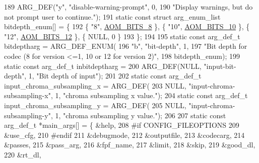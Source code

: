 \begin{DoxyCodeInclude}
{{189     ARG\_DEF(\textcolor{stringliteral}{"y"}, \textcolor{stringliteral}{"disable-warning-prompt"}, 0,
190             \textcolor{stringliteral}{"Display warnings, but do not prompt user to continue."});
191 \textcolor{keyword}{static} \textcolor{keyword}{const} \textcolor{keyword}{struct }arg\_enum\_list bitdepth\_enum[] = \{
192   \{ \textcolor{stringliteral}{"8"}, \hyperlink{group__codec_gga6ed0e98eba4651c1ad845e39498e4153a4c7f55539160206a3fbb2a6cfc9ef89c}{AOM\_BITS\_8} \}, \{ \textcolor{stringliteral}{"10"}, \hyperlink{group__codec_gga6ed0e98eba4651c1ad845e39498e4153a91734384f432233c3d681052122ab8e7}{AOM\_BITS\_10} \}, \{ \textcolor{stringliteral}{"12"}, 
      \hyperlink{group__codec_gga6ed0e98eba4651c1ad845e39498e4153a15836a87f9e9940885d5ef59a52bf728}{AOM\_BITS\_12} \}, \{ NULL, 0 \}
193 \};
194 
195 \textcolor{keyword}{static} \textcolor{keyword}{const} arg\_def\_t bitdeptharg = ARG\_DEF\_ENUM(
196     \textcolor{stringliteral}{"b"}, \textcolor{stringliteral}{"bit-depth"}, 1,
197     \textcolor{stringliteral}{"Bit depth for codec (8 for version <=1, 10 or 12 for version 2)"},
198     bitdepth\_enum);
199 \textcolor{keyword}{static} \textcolor{keyword}{const} arg\_def\_t inbitdeptharg =
200     ARG\_DEF(NULL, \textcolor{stringliteral}{"input-bit-depth"}, 1, \textcolor{stringliteral}{"Bit depth of input"});
201 
202 \textcolor{keyword}{static} \textcolor{keyword}{const} arg\_def\_t input\_chroma\_subsampling\_x = ARG\_DEF(
203     NULL, \textcolor{stringliteral}{"input-chroma-subsampling-x"}, 1, \textcolor{stringliteral}{"chroma subsampling x value."});
204 \textcolor{keyword}{static} \textcolor{keyword}{const} arg\_def\_t input\_chroma\_subsampling\_y = ARG\_DEF(
205     NULL, \textcolor{stringliteral}{"input-chroma-subsampling-y"}, 1, \textcolor{stringliteral}{"chroma subsampling y value."});
206 
207 \textcolor{keyword}{static} \textcolor{keyword}{const} arg\_def\_t *main\_args[] = \{ &help,
208 \textcolor{preprocessor}{#if CONFIG\_FILEOPTIONS}
209                                         &use\_cfg,
210 \textcolor{preprocessor}{#endif}
211                                         &debugmode,
212                                         &outputfile,
213                                         &codecarg,
214                                         &passes,
215                                         &pass\_arg,
216                                         &fpf\_name,
217                                         &limit,
218                                         &skip,
219                                         &good\_dl,
220                                         &rt\_dl,
}}
\end{DoxyCodeInclude}
